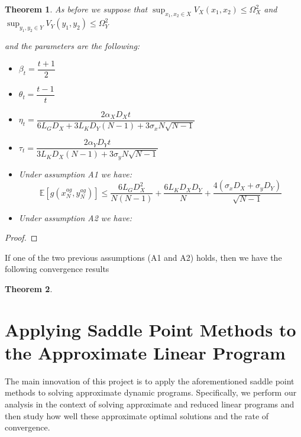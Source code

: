 \documentclass[12pt,reqno]{amsart}
\newtheorem{thm}{Theorem}[section]
\numberwithin{equation}{section}
\begin{document}
\begin{thm}


As before we suppose that
 $\sup_{x_{1},x_{2} \in X} V_{X}(x_{1},x_{2}) \leq \Omega_{X}^{2}$ and 
$\sup_{y_{1},y_{2} \in Y} V_{Y}(y_{1},y_{2}) \leq \Omega_{Y}^{2}$

and the parameters are the following:

\begin{itemize}
\item $\beta_{t} = \dfrac{t+1}{2}$
\item $\theta_{t} = \dfrac{t-1}{t}$
\item $\eta_{t} = \dfrac{2\alpha_{X}D_{X}t}{6L_{G}D_{X} + 3L_{K}D_{Y}(N-1) + 3\sigma_{x}N\sqrt{N-1}}$
\item $\tau_{t} = \dfrac{2\alpha_{Y}D_{Y}t}{3L_{K}D_{X}(N-1) + 3\sigma_{y}N\sqrt{N-1}}$
\end{itemize}

\begin{itemize}
\item Under assumption A1 we have:
$$
\mathbb{E}[g(x_{N}^{ag},y_{N}^{ag})] \leq \dfrac{6L_{G}D_{X}^{2}}{N(N-1)} + \dfrac{6L_{K}D_{X}D_{Y}}{N} + \dfrac{4(\sigma_{x}D_{X} + \sigma_{y}D_{Y})}{\sqrt{N-1}} 
$$
\item Under assumption A2 we have:

\end{itemize}

\end{thm}

\begin{proof}

\end{proof}




If one of the two previous assumptions (A1 and A2) holds, then we have the following convergence results 


\begin{thm}

\end{thm}




\section{Applying Saddle Point Methods to the Approximate Linear Program}

The main innovation of this project is to apply the aforementioned saddle point methods to solving approximate dynamic programs. Specifically, we perform our analysis in the context of solving approximate and reduced linear programs and then study how well these approximate optimal solutions and the rate of convergence.
\end{document}
